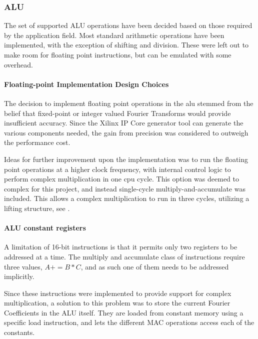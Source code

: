 \FloatBarrier
\subsubsection{ALU}\label{subsec:fpga-alu}

The set of supported ALU operations have been decided based on those required by
the application field. Most standard arithmetic operations have been
implemented, with the exception of shifting and division. These were left out
to make room for floating point instructions, but can be emulated with some
overhead.

\paragraph{Floating-point Implementation Design Choices}
The decision to implement floating point operations in the alu stemmed from the
belief that fixed-point or integer valued Fourier Transforms would provide
insufficient accuracy. Since the Xilinx IP Core generator tool can generate the
various components needed, the gain from precision was considered to outweigh the
performance cost.

Ideas for further improvement upon the implementation was to run the floating
point operations at a higher clock frequency, with internal control logic to
perform complex multiplication in one cpu cycle. This option was deemed to
complex for this project, and instead single-cycle multiply-and-accumulate was
included. This allows a complex multiplication to run in three cycles, utilizing
a lifting structure, see \cite{oraintara}.

\paragraph{ALU constant registers}
A limitation of 16-bit instructions is that it permits only two registers to be
addressed at a time. The multiply and accumulate class of instructions require
three values, $A += B*C$, and as such one of them needs to be addressed
implicitly.

Since these instructions were implemented to provide support for
complex multiplication, a solution to this problem was to store the current Fourier
Coefficients in the ALU itself. They are loaded from constant memory using a
specific load instruction, and lets the different MAC operations access each of
the constants.
